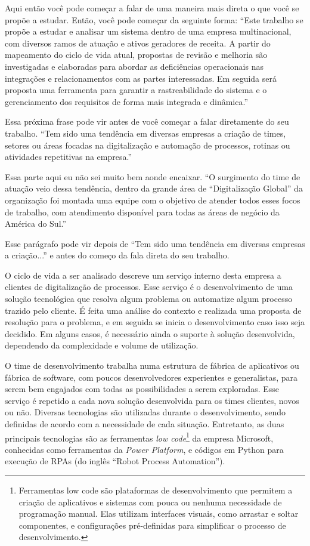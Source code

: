 	{\color{green} Aqui então você pode começar a falar de uma maneira mais direta o que você se propõe a estudar. Então, você pode começar da seguinte forma: ``Este trabalho se propõe a estudar e analisar um sistema dentro de uma empresa multinacional, com diversos ramos de atuação e ativos geradores de receita. A partir do mapeamento do ciclo de vida atual, propostas de revisão e melhoria são investigadas e elaboradas para abordar as deficiências operacionais nas integrações e relacionamentos com as partes interessadas. Em seguida será proposta uma ferramenta para garantir a rastreabilidade do sistema e o gerenciamento dos requisitos de forma mais integrada e dinâmica.''}

	{\color{green} Essa próxima frase pode vir antes de você começar a falar diretamente do seu trabalho. ``Tem sido uma tendência em diversas empresas a criação de times, setores ou áreas focadas na digitalização e automação de processos, rotinas ou 
	atividades repetitivas na empresa.''} 
	
	{\color{green} Essa parte aqui eu não sei muito bem aonde encaixar. ``O surgimento do time de atuação veio dessa tendência, dentro da grande área de ``Digitalização Global'' da organização foi montada uma equipe com o objetivo de atender todos esses focos de trabalho, com atendimento disponível para todas as áreas de negócio da América do Sul.''} 

	{\color{green} Esse parágrafo pode vir depois de ``Tem sido uma tendência em diversas empresas a criação...'' e antes do começo da fala direta do seu trabalho.}

	O ciclo de vida a ser analisado descreve um serviço interno desta empresa a clientes de digitalização de processos. Esse serviço é o desenvolvimento de uma solução 
	tecnológica que resolva algum problema ou automatize algum processo trazido pelo 
	cliente. É feita uma análise do contexto e realizada uma proposta de resolução 
	para o problema, e em seguida se inicia o desenvolvimento caso isso seja decidido. 
	Em alguns casos, é necessário ainda o suporte à solução desenvolvida, dependendo 
	da complexidade e volume de utilização. 

	O time de desenvolvimento trabalha numa estrutura de fábrica de aplicativos ou fábrica de software, 
	com poucos desenvolvedores experientes e generalistas, para serem bem 
	engajados com todas as possibilidades a serem exploradas. Esse serviço é repetido 
	a cada nova solução desenvolvida para os times clientes, novos ou não. 
	Diversas tecnologias são utilizadas durante o desenvolvimento, sendo definidas de 
	acordo com a necessidade de cada situação. Entretanto, as duas principais 
	tecnologias são as ferramentas \textit{low code}\footnote{Ferramentas low code são plataformas de desenvolvimento que permitem a criação de aplicativos e sistemas com pouca ou nenhuma necessidade de programação manual. Elas utilizam interfaces visuais, como arrastar e soltar componentes, e configurações pré-definidas para simplificar o processo de desenvolvimento.} da empresa Microsoft, conhecidas como 
	ferramentas da \textit{Power Platform}, e códigos em Python para execução de RPAs (do 
	inglês ``Robot Process Automation''). 

